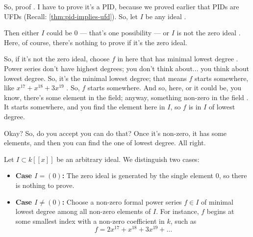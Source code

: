 \begin{proofWrapper}

\begin{speech}[00:03:56 - 00:05:31]
So, proof . I have to prove it's a PID, because we proved earlier that PIDs are UFDs (Recall: \cref{thm:pid-implies-ufd}). So, let $I$ be any ideal .

Then either $I$ could be $0$  --- that's one possibility --- or $I$ is not the zero ideal . Here, of course, there's nothing to prove if it's the zero ideal.

So, if it's not the zero ideal, choose $f$ in here that has minimal lowest degree . Power series don't have highest degrees; you don't think about... you think about lowest degree. So, it's the minimal lowest degree; that means $f$ starts somewhere, like $x^{17} + x^{18} + 3x^{19}$ . So, $f$ starts somewhere. And so, here, or it could be, you know, there's some element in the field; anyway, something non-zero in the field . It starts somewhere, and you find the element here in $I$, so $f$ is in $I$ of lowest degree.

Okay? So, do you accept you can do that? Once it's non-zero, it has some elements, and then you can find the one of lowest degree. All right.
\end{speech}

\begin{content}
Let $I \subset k[[x]]$ be an arbitrary ideal. We distinguish two cases:
\begin{itemize}
    \item \textbf{Case $I = (0)$:} The zero ideal is generated by the single element $0$, so there is nothing to prove.
    \item \textbf{Case $I \neq (0)$:} Choose a non-zero formal power series $f \in I$ of minimal lowest degree among all non-zero elements of $I$. For instance, $f$ begins at some smallest index with a non-zero coefficient in $k$, such as
    \[
    f = 2x^{17} + x^{18} + 3x^{19} + \dots
    \]
\end{itemize}
\end{content}


\end{proofWrapper}
